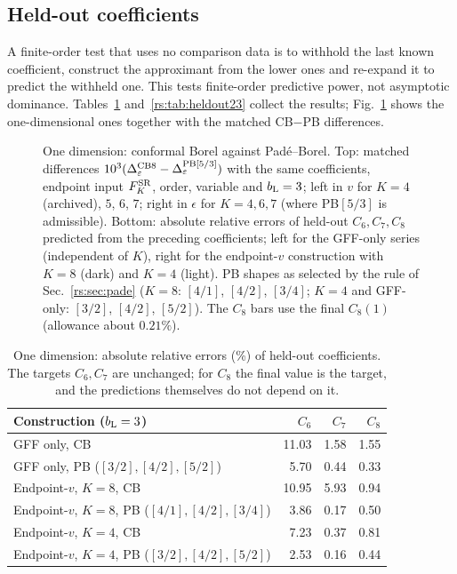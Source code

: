 \subsection{Held-out coefficients}
A finite-order test that uses no comparison data is to withhold the last known
coefficient, construct the approximant from the lower ones and re-expand it to predict
the withheld one. This tests finite-order predictive power, not asymptotic dominance.
Tables~\ref{rs:tab:heldout1} and~\ref{rs:tab:heldout23} collect the results;
Fig.~\ref{rs:fig:instanton} shows the one-dimensional ones together with the matched
CB$-$PB differences.

\begin{figure}[htbp]\centering
{}
\caption{One dimension: conformal Borel against Pad\'e--Borel. Top: matched differences
$10^3(\Delta_\varepsilon^{\rm CB8}-\Delta_\varepsilon^{{\rm PB}[5/3]})$ with the same coefficients, endpoint input
$F^{\rm SR}_K$, order, variable and $b_{\mathrm L}=3$; left in $v$ for $K=4$ (archived), $5$, $6$, $7$; right in
$\epsilon$ for $K=4,6,7$ (where PB$[5/3]$ is admissible). Bottom: absolute relative errors of
held-out $C_6,C_7,C_8$ predicted from the preceding coefficients; left for the GFF-only
series (independent of $K$), right for the endpoint-$v$ construction with $K=8$ (dark) and
$K=4$ (light). PB shapes as selected by the rule of Sec.~\ref{rs:sec:pade} ($K=8$: $[4/1]$, $[4/2]$, $[3/4]$;
$K=4$ and GFF-only: $[3/2]$, $[4/2]$, $[5/2]$). The $C_8$ bars use the final $C_8(1)$
(allowance about $0.21\%$).}
\label{rs:fig:instanton}
\end{figure}

\begin{table}[htbp]\centering\small
\begin{tabular}{@{}l r r r@{}}
\toprule
Construction ($b_{\mathrm L}=3$) & $C_6$ & $C_7$ & $C_8$\\ \midrule
GFF only, CB & 11.03 & 1.58 & 1.55\\
GFF only, PB ($[3/2],[4/2],[5/2]$) & 5.70 & 0.44 & 0.33\\
Endpoint-$v$, $K=8$, CB & 10.95 & 5.93 & 0.94\\
Endpoint-$v$, $K=8$, PB ($[4/1],[4/2],[3/4]$) & 3.86 & 0.17 & 0.50\\
Endpoint-$v$, $K=4$, CB & 7.23 & 0.37 & 0.81\\
Endpoint-$v$, $K=4$, PB ($[3/2],[4/2],[5/2]$) & 2.53 & 0.16 & 0.44\\
\bottomrule
\end{tabular}
\caption{One dimension: absolute relative errors (\%) of held-out coefficients. The
targets $C_6,C_7$ are unchanged; for $C_8$ the final value is the target, and the
predictions themselves do not depend on it.}
\label{rs:tab:heldout1}
\end{table}

